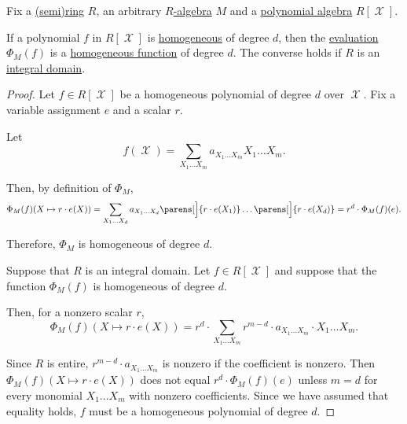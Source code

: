 \begin{proposition}\label{thm:homogeneous_polynomial_iff_homogeneous_function}
  Fix a \hyperref[def:semiring]{(semi)ring} \( R \), an arbitrary \hyperref[def:algebra_over_semiring]{\( R \)-algebra} \( M \) and a \hyperref[def:polynomial_algebra]{polynomial algebra} \( R[\mscrX] \).

  If a polynomial \( f \) in \( R[\mscrX] \) is \hyperref[def:homogeneous_polynomial]{homogeneous} of degree \( d \), then the \hyperref[con:evaluation_homomorphism]{evaluation} \( \Phi_M(f) \) is a \hyperref[def:real_homogeneous_function]{homogeneous function} of degree \( d \). The converse holds if \( R \) is an \hyperref[def:integral_domain]{integral domain}.
\end{proposition}
\begin{proof}
  \SufficiencySubProof Let \( f \in R[\mscrX] \) be a homogeneous polynomial of degree \( d \) over \( \mscrX \). Fix a variable assignment \( e \) and a scalar \( r \).

  Let
  \begin{equation*}
    f(\mscrX) = \sum_{X_1 \ldots X_m} a_{X_1 \ldots X_m} X_1 \ldots X_m.
  \end{equation*}

  Then, by definition of \( \Phi_M \),
  \begin{equation*}
    \Phi_M(f)(X \mapsto r \cdot e(X))
    =
    \sum_{X_1 \ldots X_d} a_{X_1 \ldots X_d} \parens[\Big]{ r \cdot e(X_1) } \ldots \parens[\Big]{ r \cdot e(X_d) }
    =
    r^d \cdot \Phi_M(f)(e).
  \end{equation*}

  Therefore, \( \Phi_M \) is homogeneous of degree \( d \).

  \NecessitySubProof Suppose that \( R \) is an integral domain. Let \( f \in R[\mscrX] \) and suppose that the function \( \Phi_M(f) \) is homogeneous of degree \( d \).

  Then, for a nonzero scalar \( r \),
  \begin{equation*}
    \Phi_M(f)(X \mapsto r \cdot e(X))
    =
    r^d \cdot \sum_{X_1 \ldots X_m} r^{m - d} \cdot a_{X_1 \ldots X_m} \cdot X_1 \ldots X_m.
  \end{equation*}

  Since \( R \) is entire, \( r^{m - d} \cdot a_{X_1 \ldots X_m} \) is nonzero if the coefficient is nonzero. Then \( \Phi_M(f)(X \mapsto r \cdot e(X)) \) does not equal \( r^d \cdot \Phi_M(f)(e) \) unless \( m = d \) for every monomial \( X_1 \ldots X_m \) with nonzero coefficients. Since we have assumed that equality holds, \( f \) must be a homogeneous polynomial of degree \( d \).
\end{proof}

